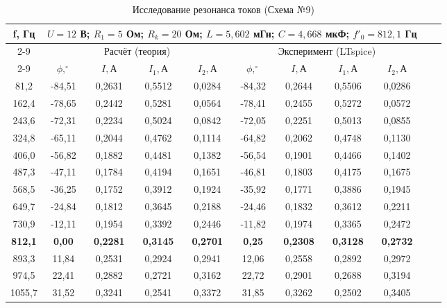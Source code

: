 \documentclass[a4paper,12pt]{article}
\begin{document}
\begin{table}[H]
\centering
\caption{Исследование резонанса токов (Схема №9)}
\label{tab:table24_final}
\scriptsize
\renewcommand{\arraystretch}{1.3}
\begin{tabular}{|c|c|c|c|c|c|c|c|c|c|c|}
\hline
\multirow{4}{*}{f, Гц} & \multicolumn{8}{c|}{$U = 12$ В; $R_1 = 5$ Ом; $R_k = 20$ Ом; $L = 5,602$ мГн; $C = 4,668$ мкФ; $f'_0 = 812,1$ Гц} \\ \cline{2-9} 
 & \multicolumn{4}{c|}{Расчёт (теория)} & \multicolumn{4}{c|}{Эксперимент (LTspice)} \\ \cline{2-9} 
 & \multicolumn{1}{c|}{$\phi, ^\circ$} & \multicolumn{1}{c|}{$I, А$} & \multicolumn{1}{c|}{$I_1, А$} & $I_2, А$ & \multicolumn{1}{c|}{$\phi, ^\circ$} & \multicolumn{1}{c|}{$I, А$} & \multicolumn{1}{c|}{$I_1, А$} & $I_2, А$ \\ \hline
81,2   & -84,51 & 0,2631 & 0,5512 & 0,0284 & -84,32 & 0,2644 & 0,5506 & 0,0286 \\ \hline
162,4  & -78,65 & 0,2442 & 0,5281 & 0,0564 & -78,41 & 0,2455 & 0,5272 & 0,0572 \\ \hline
243,6  & -72,31 & 0,2234 & 0,5024 & 0,0842 & -72,05 & 0,2251 & 0,5013 & 0,0855 \\ \hline
324,8  & -65,11 & 0,2044 & 0,4762 & 0,1114 & -64,82 & 0,2062 & 0,4748 & 0,1130 \\ \hline
406,0  & -56,82 & 0,1882 & 0,4481 & 0,1382 & -56,54 & 0,1901 & 0,4466 & 0,1402 \\ \hline
487,3  & -47,11 & 0,1784 & 0,4194 & 0,1651 & -46,81 & 0,1803 & 0,4175 & 0,1675 \\ \hline
568,5  & -36,25 & 0,1752 & 0,3912 & 0,1924 & -35,92 & 0,1771 & 0,3886 & 0,1945 \\ \hline
649,7  & -24,84 & 0,1812 & 0,3645 & 0,2188 & -24,46 & 0,1832 & 0,3612 & 0,2211 \\ \hline
730,9  & -12,11 & 0,1954 & 0,3392 & 0,2446 & -11,82 & 0,1974 & 0,3365 & 0,2472 \\ \hline
\textbf{812,1} & \textbf{0,00} & \textbf{0,2281} & \textbf{0,3145} & \textbf{0,2701} & \textbf{0,25} & \textbf{0,2308} & \textbf{0,3128} & \textbf{0,2732} \\ \hline
893,3  & 11,84  & 0,2531 & 0,2924 & 0,2941 & 12,06  & 0,2558 & 0,2892 & 0,2972 \\ \hline
974,5  & 22,41  & 0,2882 & 0,2721 & 0,3162 & 22,72  & 0,2901 & 0,2688 & 0,3194 \\ \hline
1055,7 & 31,52  & 0,3241 & 0,2541 & 0,3372 & 31,85  & 0,3262 & 0,2502 & 0,3405 \\ \hline

\end{tabular}
\end{table}
\end{document}
